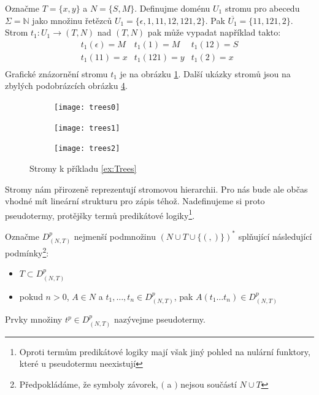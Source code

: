 \documentclass[a4paper,10pt]{article}
\begin{document}
\begin{example} \label{ex:Trees}
 Označme $T = \{ x, y \}$ a $N = \{ S, M \}$. Definujme doménu $U_1$ stromu pro abecedu $\Sigma = \mathbb{N}$ jako množinu řetězců $U_1 = \{ \epsilon, 1, 11, 12, 121, 2 \}$. Pak $\overline{U_1} = \{ 11, 121, 2 \}$. Strom $t_1: U_1 \rightarrow (T, N)$ nad $(T, N)$ pak může vypadat například takto:
 $$
 \begin{array}{lll}
   t_1(\epsilon) = M	& t_1(1) = M	& t_1(12) = S \\
   t_1(11) = x		& t_1(121) = y	& t_1(2) = x \\
  \end{array}
 $$
 Grafické znázornění stromu $t_1$ je na obrázku \ref{img:Tree:first}. Další ukázky stromů jsou na zbylých podobrázcích obrázku \ref{img:Tree}.  
\end{example}

\begin{figure}
  \begin{subfigure}[t]{0.3\textwidth} \centering
   \texttt{[image: trees0]}
   \caption{} \label{img:Tree:first}
  \end{subfigure}
%  
  \begin{subfigure}[t]{0.3\textwidth} \centering
   \texttt{[image: trees1]}
   \caption{} \label{img:Tree:second}
  \end{subfigure}
%  
  \begin{subfigure}[t]{0.3\textwidth} \centering
   \texttt{[image: trees2]}
   \caption{} \label{img:Tree:third}
  \end{subfigure}
  
 \caption{Stromy k příkladu \ref{ex:Trees}} \label{img:Tree}
\end{figure}

Stromy nám přirozeně reprezentují stromovou hierarchii. Pro nás bude ale občas vhodné mít lineární strukturu pro zápis téhož. Nadefinujeme si proto pseudotermy, protějšky termů predikátové logiky\footnote{Oproti termům predikátové logiky mají však jiný pohled na nulární funktory, které u pseudotermu neexistují}.

\begin{definition}[Pseudoterm]
 Označme $D_{(N,T)}^p$ nejmenší podmnožinu
 $(N \cup T \cup \{ (, ) \})^*$ splňující následující podmínky\footnote{
    Předpokládáme, že symboly závorek, $($ a $)$ nejsou součástí $N \cup T$}:
 \begin{itemize}
  \item $T \subset D_{(N,T)}^p$
  \item pokud $n > 0$, $A \in N$ a $t_1, \dots, t_n \in D_{(N,T)}^p$, pak $A(t_1 \dots t_n) \in D_{(N,T)}^p$ 
 \end{itemize}
 Prvky množiny $t^p \in D_{(N,T)}^p$ nazývejme pseudotermy.
\end{definition}
\end{document}
